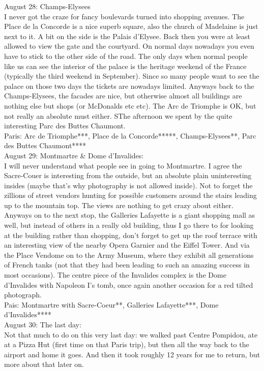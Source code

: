 August 28: Champs-Elysees\\
I never got the craze for fancy boulevards turned into shopping avenues. The Place de la Concorde is a nice superb square, also the church of Madelaine is just next to it. A bit on the side is the Palais d'Elysee. Back then you were at least allowed to view the gate and the courtyard. On normal days nowadays you even have to stick to the other side of the road. The only days when normal people like us can see the interior of the palace is the heritage weekend of the France (typically the third weekend in September). Since so many people want to see the palace on those two days the tickets are nowadays limited. Anyways back to the Champs-Elysees, the facades are nice, but otherwise almost all buildings are nothing else but shops (or McDonalds etc etc). The Arc de Triomphe is OK, but not really an absolute must either. SThe afternoon we spent by the quite interesting Parc des Buttes Chaumont.\\

Paris: Arc de Triomphe***, Place de la Concorde*****, Champs-Elysees**, Parc des Buttes Chaumont****\\

August 29: Montmartre \& Dome d'Invalides:\\
I will never understand what people see in going to Montmartre. I agree the Sacre-Couer is interesting from the outside, but an absolute plain uninteresting insides (maybe that's why photography is not allowed inside). Not to forget the zillions of street vendors hunting for possible customers around the stairs leading up to the mountain top. The views are nothing to get crazy about either. Anyways on to the next stop, the Galleries Lafayette is a giant shopping mall as well, but instead of others in a really old building, thus I go there to for looking at the building rather than shopping, don't forget to get up the roof terrace with an interesting view of the nearby Opera Garnier and the Eiffel Tower. And via the Place Vendome on to the Army Museum, where they exhibit all generations of French tanks (not that they had been leading to such an amazing success in most occasions). The centre piece of the Invalides complex is the Dome d'Invalides with Napoleon I's tomb, once again another occasion for a red tilted photograph.\\

Pais: Montmartre with Sacre-Coeur**, Galleries Lafayette***, Dome d'Invalides****\\

August 30: The last day:\\ %
Not that much to do on this very last day: we walked past Centre Pompidou, ate at a Pizza Hut (first time on that Paris trip), but then all the way back to the airport and home it goes. And then it took roughly 12 years for me to return, but more about that later on.


